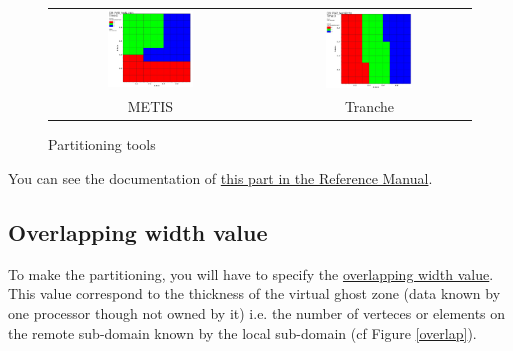 \begin{figure}[h!]
\begin{centering}
\begin{tabular}{ccc}
\includegraphics[width=0.45\textwidth]{partition_metis.jpeg} & & \includegraphics[width=0.45\textwidth]{partition_tranche.jpeg}\tabularnewline
METIS & & Tranche\tabularnewline
\end{tabular}
\par\end{centering}
\caption{Partitioning tools}
\label{partitioning}
\end{figure}

You can see the documentation of \href{\REFERENCEMANUAL\#partition}{this part in the \trustref Reference Manual}.



\subsection{Overlapping width value}
To make the partitioning, you will have to specify the \underline{overlapping width value}.
This value correspond to the thickness of the virtual ghost zone (data known by one processor though not owned by it) i.e. the number of verteces or elements on the remote sub-domain known by the local sub-domain (cf Figure \ref{overlap}).

